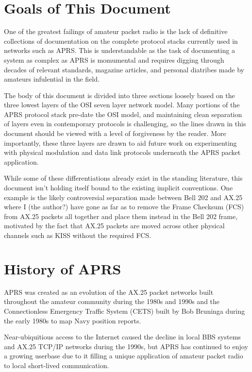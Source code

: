 \section{Goals of This Document}

One of the greatest failings of amateur packet radio is the lack of definitive
collections of documentation on the complete protocol stacks currently used in 
networks such as APRS. This is understandable as the task of documenting a 
system as complex as APRS is momumental and requires digging through decades of 
relevant standards, magazine articles, and personal diatribes made by amateurs
infulential in the field.

The body of this document is divided into three sections loosely based on the 
three lowest layers of the OSI seven layer network model. Many portions of the APRS
protocol stack
pre-date the OSI model, and maintaining clean separation of layers even in 
contemporary protocols is challenging, so the lines drawn in this document should
be viewed with a level of forgiveness by the reader. More importantly, these three
layers are drawn to aid future work on experimenting with physical modulation 
and data link protocols underneath the APRS packet application.

While some of these differentiations already exist in the standing literature,
this document isn't holding itself bound to the existing implicit conventions.
One example is the likely controversial separation made between Bell 202 and 
AX.25 where I (the author?) have gone as far as to
remove the Frame Checksum (FCS) from AX.25 packets all together and place them
instead in the Bell 202 frame, motivated by the fact that AX.25 packets are moved
across other physical channels such as KISS without the required FCS.

\section{History of APRS}

APRS was created as an evolution of the AX.25 packet networks
built throughout the amateur community during the 1980s and 1990s and 
the Connectionless Emergency Traffic System (CETS) built by 
Bob Bruninga during the early 1980s to map Navy position reports.

Near-ubiquitious access to the Internet caused the decline in local BBS 
systems and AX.25 TCP/IP networks during the 1990s, but APRS has 
continued to enjoy a growing userbase due to it filling a unique 
application of amateur packet radio to local short-lived communication.

